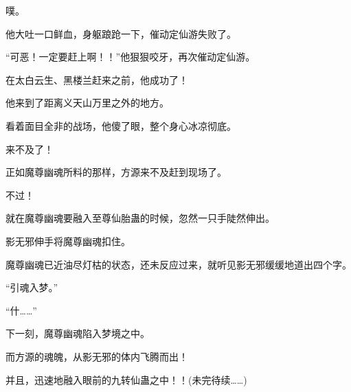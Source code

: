 \begin{this_body}
噗。

他大吐一口鲜血，身躯踉跄一下，催动定仙游失败了。

“可恶！一定要赶上啊！！”他狠狠咬牙，再次催动定仙游。

在太白云生、黑楼兰赶来之前，他成功了！

他来到了距离义天山万里之外的地方。

看着面目全非的战场，他傻了眼，整个身心冰凉彻底。

来不及了！

正如魔尊幽魂所料的那样，方源来不及赶到现场了。

不过！

就在魔尊幽魂要融入至尊仙胎蛊的时候，忽然一只手陡然伸出。

影无邪伸手将魔尊幽魂扣住。

魔尊幽魂已近油尽灯枯的状态，还未反应过来，就听见影无邪缓缓地道出四个字。

“引魂入梦。”

“什……”

下一刻，魔尊幽魂陷入梦境之中。

而方源的魂魄，从影无邪的体内飞腾而出！

并且，迅速地融入眼前的九转仙蛊之中！！(未完待续……)

\end{this_body}

